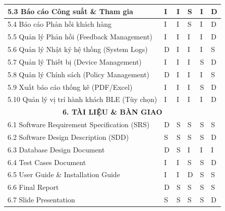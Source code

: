 \documentclass[a4paper,12pt]{article}
\begin{document}
\begin{longtable}{|p{5.5cm}|p{2.2cm}|p{2.2cm}|p{2.2cm}|p{2.2cm}|p{2.2cm}|}
		5.3 Báo cáo Công suất \& Tham gia & I & I & S & I & D \\
		\hline
		5.4 Báo cáo Phản hồi khách hàng & I & I & S & I & D \\
		\hline
		5.5 Quản lý Phản hồi (Feedback Management) & I & I & I & I & D \\
		\hline
		5.6 Quản lý Nhật ký hệ thống (System Logs) & D & I & I & I & S \\
		\hline
		5.7 Quản lý Thiết bị (Device Management) & I & I & I & S & D \\
		\hline
		5.8 Quản lý Chính sách (Policy Management) & D & I & I & I & S \\
		\hline
		5.9 Xuất báo cáo thống kê (PDF/Excel) & I & I & I & S & D \\
		\hline
		5.10 Quản lý vị trí hành khách BLE (Tùy chọn) & I & I & I & I & D \\
		\hline
		\multicolumn{6}{|c|}{\textbf{6. TÀI LIỆU \& BÀN GIAO}} \\
		\hline
		6.1 Software Requirement Specification (SRS) & D & S & S & S & S \\
		\hline
		6.2 Software Design Description (SDD) & S & S & S & S & D \\
		\hline
		6.3 Database Design Document & D & S & I & I & I \\
		\hline
		6.4 Test Cases Document & I & I & S & S & D \\
		\hline
		6.5 User Guide \& Installation Guide & I & I & D & S & S \\
		\hline
		6.6 Final Report & D & S & S & S & S \\
		\hline
		6.7 Slide Presentation & S & S & S & S & D \\
		\hline
	\end{longtable}
	
\end{document}
